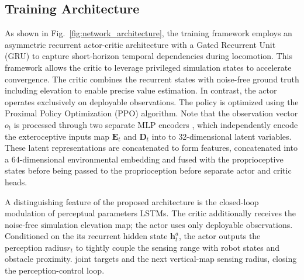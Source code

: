 \documentclass[letterpaper, 10 pt, conference]{ieeeconf/ieeeconf}
\providecommand{\DIFadd}[1]{{\protect\color{blue} \sf #1}} %
\providecommand{\DIFdel}[1]{{\protect\color{red} \scriptsize #1}} %
\providecommand{\DIFaddbegin}{} %
\providecommand{\DIFaddend}{} %
\providecommand{\DIFdelbegin}{} %
\providecommand{\DIFdelend}{} %
\begin{document}
\subsection{Training Architecture}
\label{sec:training_architecture}

As shown in Fig.~\ref{fig:network_architecture}, \DIFdelbegin \DIFdel{the training framework employs an asymmetric recurrent actor-critic architecture with a Gated Recurrent Unit (GRU) to capture short-horizon temporal dependencies during locomotion. This framework allows the critic to leverage privileged simulation states to accelerate convergence. 
The critic combines the recurrent states with noise-free ground truth including elevation to enable precise value estimation. 
In contrast, the actor operates exclusively on deployable observations.
The policy is optimized using the Proximal Policy Optimization (PPO) algorithm. Note that the observation vector $o_t$ is processed through }\DIFdelend two separate MLP encoders \DIFdelbegin \DIFdel{, which independently encode the exteroceptive inputs }\DIFdelend \DIFaddbegin \DIFadd{map }\DIFaddend $\mathbf{E}_t$ and $\mathbf{D}_t$ \DIFdelbegin \DIFdel{into }\DIFdelend \DIFaddbegin \DIFadd{to }\DIFaddend 32-dimensional \DIFdelbegin \DIFdel{latent variables. These latent representations are concatenated to form }\DIFdelend \DIFaddbegin \DIFadd{features, concatenated into }\DIFaddend a 64-dimensional environmental embedding and fused with \DIFdelbegin \DIFdel{the proprioceptive states before being passed to the }\DIFdelend \DIFaddbegin \DIFadd{proprioception before separate }\DIFaddend actor and critic \DIFdelbegin \DIFdel{heads. }%

\DIFdel{A distinguishing feature of the proposed architecture is the closed-loop modulation of perceptual parameters}\DIFdelend \DIFaddbegin \DIFadd{LSTMs. The critic additionally receives the noise-free simulation elevation map; the actor uses only deployable observations}\DIFaddend . Conditioned on \DIFdelbegin \DIFdel{the }\DIFdelend \DIFaddbegin \DIFadd{its }\DIFaddend recurrent hidden state \DIFaddbegin \DIFadd{$\mathbf{h}^{a}_t$}\DIFaddend , the actor outputs \DIFdelbegin \DIFdel{the perception radius$r_t$ to tightly couple the sensing range with robot states and obstacle proximity.
}\DIFdelend \DIFaddbegin \DIFadd{joint targets and the next vertical-map sensing radius, closing the perception-control loop.
}
\end{document}
